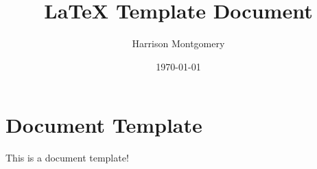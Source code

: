 \documentclass[12pt]{article}
\title{LaTeX Template Document}
\author{Harrison Montgomery}
\date{\today}
\begin{document}
\maketitle
\section{Document Template}
This is a document template! \parencite{de_beukelaer_developing_2015}

\printbibliography
\end{document}
